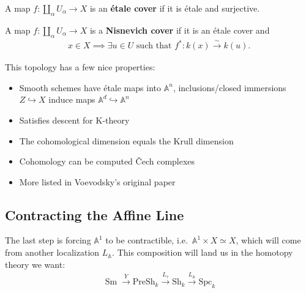 \begin{definition}

A map \(f: \coprod_\alpha U_\alpha \to X\) is an \textbf{étale cover} if
it is étale and surjective.

\end{definition}

\begin{definition}

A map \(f: \coprod_\alpha U_\alpha \to X\) is a \textbf{Nisnevich cover}
if it is an étale cover and
\begin{align*}
x\in X \implies \exists u\in U \text{ such that } f^*: k(x) \xrightarrow{\sim}k(u)
.\end{align*}

\end{definition}

\begin{remark}

This topology has a few nice properties:

\begin{itemize}
\tightlist
\item
  Smooth schemes have étale maps into \({\mathbb{A}}^n\),
  inclusions/closed immersions \(Z \hookrightarrow X\) induce maps
  \({\mathbb{A}}^d \hookrightarrow{\mathbb{A}}^n\)
\item
  Satisfies descent for K-theory
\item
  The cohomological dimension equals the Krull dimension
\item
  Cohomology can be computed Čech complexes
\item
  More listed in Voevodsky's original paper
\end{itemize}

\end{remark}

\hypertarget{contracting-the-affine-line}{%
\subsection{Contracting the Affine
Line}\label{contracting-the-affine-line}}

The last step is forcing \({\mathbb{A}}^1\) to be contractible,
i.e.~\({\mathbb{A}}^1 \times X \simeq X\), which will come from another
localization \(L_{\mathbb{A}}\). This composition will land us in the
homotopy theory we want:
\begin{align*}
{\operatorname{Sm}}\xrightarrow{Y} \text{PreSh}_k \xrightarrow{L_\tau} \text{Sh}_k \xrightarrow{L_{{\mathbb{A}}}} \text{Spc}_k
\end{align*}

